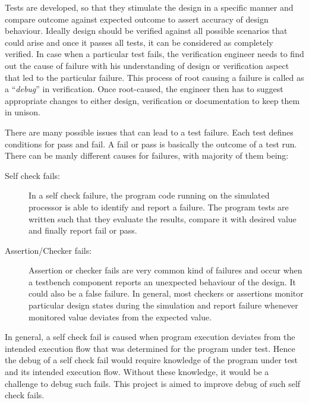Tests are developed, so that they stimulate the design in a specific manner and compare outcome against expected outcome to assert accuracy of design behaviour. Ideally design should be verified against all possible scenarios that could arise and once it passes all tests, it can be considered as completely verified. In case when a particular test fails, the verification engineer needs to find out the cause of failure with his understanding of design or verification aspect that led to the particular failure. This process of root causing a failure is called as a ``{\it debug}'' in verification. Once root-caused, the engineer then has to suggest appropriate changes to either design, verification or documentation to keep them in unison. 

There are many possible issues that can lead to a test failure. Each test defines conditions for pass and fail. A fail or pass is basically the outcome of a test run. There can be manly different causes for failures, with majority of them being:

\begin{description}
	\item[Self check fails:] In a self check failure, the program code running on the simulated processor is able to identify and report a failure. The program tests are written such that they evaluate the results, compare it with desired value and finally report fail or pass. 
	\item[Assertion/Checker fails:] Assertion or checker fails are very common kind of failures and occur when a testbench component reports an unexpected behaviour of the design. It could also be a false failure. In general, most checkers or assertions monitor particular design states during the simulation and report failure whenever monitored value deviates from the expected value. 
\end{description}

In general, a self check fail is caused when program execution deviates from the intended execution flow that was determined for the program under test. Hence the debug of a self check fail would require knowledge of the program under test and its intended execution flow. Without these knowledge, it would be a challenge to debug such fails. This project is aimed to improve debug of such self check fails.

%
%
%


